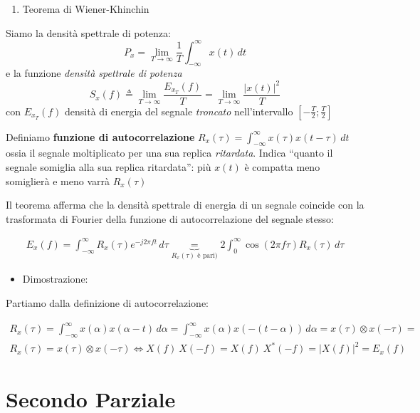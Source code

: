 \documentclass[
]{article}
\providecommand{\tightlist}{%
  \setlength{\itemsep}{0pt}\setlength{\parskip}{0pt}}
\begin{document}
\begin{enumerate}
\def\labelenumi{\arabic{enumi}.}
\setcounter{enumi}{26}
\tightlist
\item
  Teorema di Wiener-Khinchin
\end{enumerate}

Siamo la densità spettrale di potenza: \[
P_x = \lim_{T\to \infty} \frac{1}{T}\int_{-\infty}^{\infty} x(t) \,dt 
\] e la funzione \emph{densità spettrale di potenza} \[
S_x(f) \triangleq \lim_{T\to \infty} \frac{E_{x_T}(f)}{T} =\lim_{T\to\infty} \frac{|x(t)|^2}{T} 
\] con \(E_{x_T}(f)\) densità di energia del segnale \emph{troncato}
nell'intervallo \([-\frac{T}{2}; \frac{T}{2}]\)

Definiamo \textbf{funzione di autocorrelazione}
\(R_x(\tau)= \int_{-\infty}^{\infty}x(\tau)x(t-\tau)\,dt\) ossia il
segnale moltiplicato per una sua replica \emph{ritardata}. Indica
``quanto il segnale somiglia alla sua replica ritardata'': più \(x(t)\)
è compatta meno somiglierà e meno varrà \(R_x(\tau)\)

Il teorema afferma che la densità spettrale di energia di un segnale
coincide con la trasformata di Fourier della funzione di
autocorrelazione del segnale stesso:

\begin{gather*}
E_x(f)= \int_{-\infty}^{\infty}R_{x}(\tau) e^{-j2\pi ft}\,d\tau \underbrace{=}_{R_x(\tau) \text{ è pari})} 2\int_{0}^{\infty} \cos(2\pi f\tau)R_x(\tau) \,d\tau
\end{gather*}

\begin{itemize}
\tightlist
\item
  Dimostrazione:
\end{itemize}

Partiamo dalla definizione di autocorrelazione:

\begin{gather*}
R_{x} (\tau) = \int_{-\infty}^{\infty} x(\alpha) x(\alpha -t) \,d\alpha = \int_{-\infty}^{\infty} x(\alpha)x(-(t-\alpha)) \,d\alpha = x(\tau) \otimes x(-\tau) = \\
R_{x} (\tau) =  x(\tau) \otimes x(-\tau) \Longleftrightarrow X(f) \ X(-f) = X(f) \ X^{*}(-f) = |X(f)|^{2} = E_x(f)
\end{gather*}

\newpage

\section{Secondo Parziale}\label{secondo-parziale}
\end{document}
